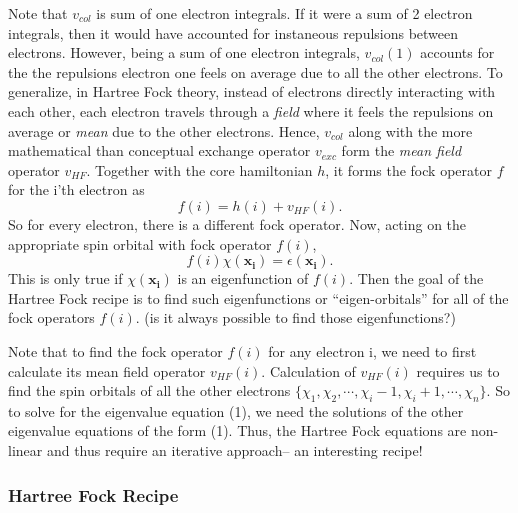 \documentclass{article}
\begin{document}
       Note that \(v_{col}\) is sum of one electron integrals. If it were a sum of
       2 electron integrals, then it would have accounted for instaneous repulsions
       between electrons. However, being a sum of one electron integrals, \(v_{col}(1)\)
       accounts for the the repulsions electron one feels on average due to all the
       other electrons. To generalize, in Hartree Fock theory, instead of electrons
       directly interacting with each other, each electron travels through a
       \textit{field} where it feels the repulsions on average or \textit{mean} due
       to the other electrons. Hence, \(v_{col}\) along with the more mathematical
       than conceptual exchange operator \(v_{exc}\) form the \textit{mean field}
       operator \(v_{HF}\). Together with the core hamiltonian \(h\), it forms the
       fock operator \(f\) for the i'th electron as
       \begin{equation}
         f(i) = h(i) + v_{HF}(i).
       \end{equation}
       So for every electron, there is a different fock operator.
       Now, acting on the appropriate spin orbital with fock operator \(f(i)\),
       \[f(i)\chi(\mathbf{x_i}) =\epsilon(\mathbf{x_i}).\]
       This is only true if \(\chi(\mathbf{x_i})\) is an eigenfunction of \(f(i)\).
       Then the goal of the Hartree Fock recipe is to find such eigenfunctions
       or ``eigen-orbitals'' for all of the fock operators \(f(i)\). (is it
       always possible to find those eigenfunctions?)

       Note that to find the fock operator \(f(i)\) for any electron i, we need
       to first calculate its mean field operator \(v_{HF}(i)\). Calculation of
       \(v_{HF}(i)\) requires us to find the spin orbitals of all the other
       electrons \(\{\chi_1, \chi_2, \cdots, \chi_i-1, \chi_i+1, \cdots,
       \chi_n\}\). So to solve for the eigenvalue equation (1), we need the solutions
       of the other eigenvalue equations of the form (1). Thus, the Hartree Fock
       equations are non-linear and thus require an iterative approach-- an
       interesting recipe!

       \subsubsection{Hartree Fock Recipe}
\end{document}

